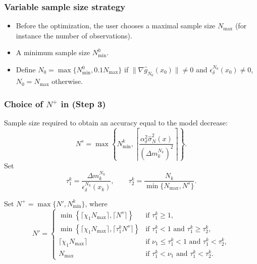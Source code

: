 \documentclass{beamer}
\begin{document}
\begin{frame}
\frametitle{Variable sample size strategy}										

\begin{itemize}
	\item 
Before the optimization, the user chooses a maximal sample size $N_{\max}$ (for instance the number of observations).
	\item 
A minimum sample size $N^0_{\min}$. %
\item
Define $N_0 = \max\lbrace N^0_{\min}, 0.1N_{\max}\rbrace$ if $\| \nabla \hat{g}_{N_0}(x_0) \| \ne 0$ and $\epsilon_{\delta}^{N_0}(x_0) \ne 0$, $N_0 = N_{\max}$ otherwise.
\end{itemize}

\end{frame}

\begin{frame}
\frametitle{Choice of $N^+$ in (Step 3)}										

Sample size required to obtain an accuracy equal to the model decrease:
\[
N^s = \max \left\lbrace N^k_{\min},
\left\lceil
\frac{\alpha^2_{\delta}  \hat{\sigma}^2_N(x)}{(\Delta m_k^{N_k})^2}
\right\rceil \right\rbrace.
\]
Set
$$
\tau_1^k = \frac{\Delta m_k^{N_k}}{\epsilon_\delta^{N_k} (x_k)},\qquad
\tau_2^k = \frac{N_k}{\min \lbrace N_{\max}, N^s \rbrace}.
$$

Set $N^+ = \max\lbrace N', N^k_{\min}\rbrace$, where
$$
N' =
\begin{cases}
	\min \left\lbrace \lceil \chi_1 N_{\max} \rceil, \lceil N^s
	\rceil \right\rbrace & \text{if } \tau_1^k \geq 1, \\
	\min \left\lbrace \lceil \chi_1 N_{\max} \rceil, \lceil \tau_1^kN^s
	\rceil  \right\rbrace &  \text{if } \tau_1^k < 1 \text{ and }
	\tau_1^k \geq  \tau_2^k,\\
	\lceil \chi_1 N_{\max} \rceil & \text{if }  \nu_1 \leq \tau_1^k <
	1\text{ and }\tau_1^k < \tau_2^k,\\
	N_{\max} & \text{if } \tau_1^k < \nu_1\text{ and }\tau_1^k < \tau_2^k.
\end{cases}
$$


\end{frame}
\end{document}
